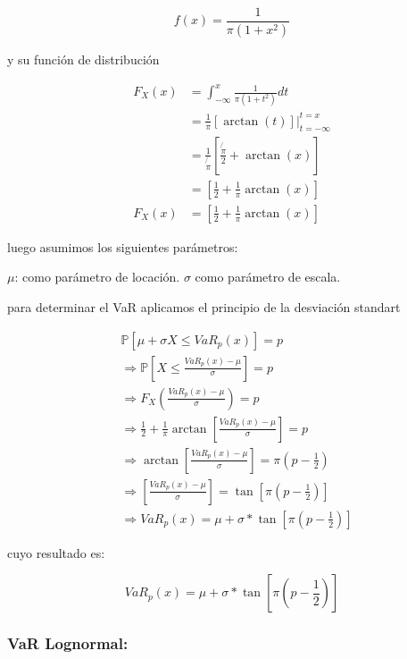 \documentclass[10pt,]{article}
\begin{document}
\[f(x)= \frac{1}{\pi(1+x^2)}\]

y su función de distribución

\[\begin{array}{rl}
F_{X}(x) &=\int_{-\infty}^{x} \frac{1}{\pi(1+t^2)}dt\\
&\displaystyle =\frac{1}{\pi} \left[ \arctan(t) \right] \big |_{t=-\infty}^{t=x}\\
&\displaystyle =\frac{1}{\not{\pi}} \left[ \frac{\not{\pi}}{2}+ \arctan(x)\right]\\
&\displaystyle =\left[ \frac{1}{2} + \frac{1}{\pi}\arctan(x)\right]\\
F_{X}(x) &=\left[ \frac{1}{2} + \frac{1}{\pi}\arctan(x)\right]
\end{array}\]

luego asumimos los siguientes parámetros:

\(\mu\): como parámetro de locación. \(\sigma\) como parámetro de
escala.

para determinar el VaR aplicamos el principio de la desviación standart

\[\begin{array}{rl}  
&\displaystyle  \mathbb{P}[\mu + \sigma X \leq VaR_{p}(x)] = p\\
&\displaystyle  \Rightarrow \mathbb{P}[X \leq \frac{VaR_{p}(x)- \mu}{\sigma}] = p\\
&\displaystyle  \Rightarrow F_{X}(\frac{VaR_{p}(x)- \mu}{\sigma}) = p\\
&\displaystyle  \Rightarrow \frac{1}{2} + \frac{1}{\pi}\arctan\left[\frac{VaR_{p}(x) - \mu}{\sigma}\right] = p\\
&\displaystyle  \Rightarrow \arctan\left[\frac{VaR_{p}(x) - \mu}{\sigma}\right] = \pi(p-\frac{1}{2})\\
&\displaystyle  \Rightarrow \left[\frac{VaR_{p}(x) - \mu}{\sigma}\right] = \tan\left[\pi(p-\frac{1}{2})\right]\\
&\displaystyle  \Rightarrow VaR_p(x)=\mu+\sigma*\tan\left[\pi\left(p-\frac{1}{2}\right)\right]
\end{array}\]

cuyo resultado es:

\[VaR_p(x)=\mu+\sigma*\tan\left[\pi\left(p-\frac{1}{2}\right)\right]\]

\hypertarget{var-lognormal}{%
\subsubsection{\texorpdfstring{\textbf{VaR
Lognormal:}}{VaR Lognormal:}}\label{var-lognormal}}
\end{document}
